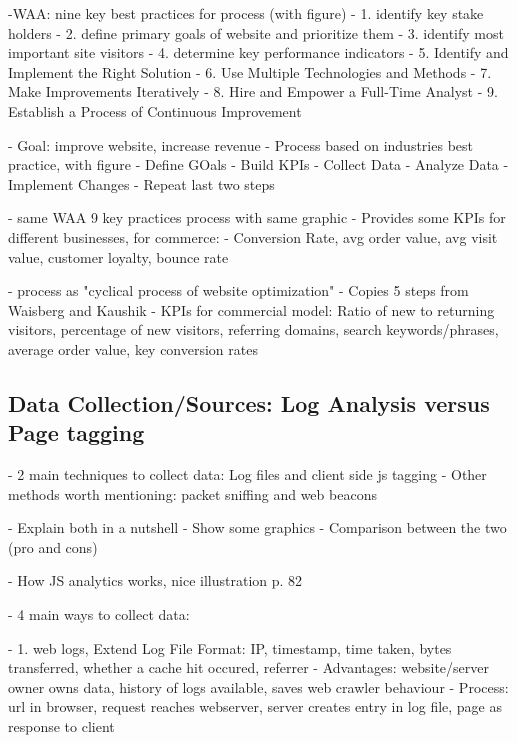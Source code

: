 -WAA: nine key best practices for process (with figure)
- 1. identify key stake holders
- 2. define primary goals of website and prioritize them
- 3. identify most important site visitors
- 4. determine key performance indicators
- 5. Identify and Implement the Right Solution
- 6. Use Multiple Technologies and Methods
- 7. Make Improvements Iteratively
- 8. Hire and Empower a Full-Time Analyst
- 9. Establish a Process of Continuous Improvement



- Goal: improve website, increase revenue
- Process based on industries best practice, with figure
- Define GOals
- Build KPIs
- Collect Data
- Analyze Data
- Implement Changes
- Repeat last two steps




- same WAA 9 key practices process with same graphic
- Provides some KPIs for different businesses, for commerce:
- Conversion Rate, avg order value, avg visit value, customer loyalty, bounce rate 



- process as "cyclical process of website optimization"
- Copies 5 steps from Waisberg and Kaushik
- KPIs for commercial model: Ratio of new to returning visitors, percentage of new visitors, referring domains, search keywords/phrases, average order value, key conversion rates








\subsection{Data Collection/Sources: Log Analysis versus Page tagging}


- 2 main techniques to collect data: Log files and client side js tagging
- Other methods worth mentioning: packet sniffing and web beacons

- Explain both in a nutshell
- Show some graphics
- Comparison between the two (pro and cons)




- How JS analytics works, nice illustration p. 82


- 4 main ways to collect data:

- 1. web logs, Extend Log File Format: IP, timestamp, time taken, bytes transferred, whether a cache hit occured, referrer
- Advantages: website/server owner owns data, history of logs available, saves web crawler behaviour
- Process: url in browser, request reaches webserver, server creates entry in log file, page as response to client

